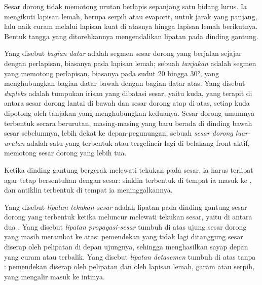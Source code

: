Sesar dorong tidak memotong urutan berlapis sepanjang satu bidang lurus.
Ia mengikuti lapisan lemah, berupa serpih atau evaporit, untuk jarak yang panjang, lalu
naik curam melalui lapisan kuat di atasnya hingga lapisan lemah berikutnya. Bentuk
tangga yang ditorehkannya mengendalikan lipatan pada dinding gantung.

\begin{definition}\label{def:b3:orogenic-wedges:thrust-geometry}
Yang disebut \emph{bagian datar} adalah segmen sesar dorong yang berjalan
sejajar dengan perlapisan, biasanya pada lapisan lemah; sebuah \emph{tanjakan}
adalah segmen yang memotong perlapisan,
biasanya pada sudut 20 hingga \ang{30}, yang menghubungkan bagian datar bawah dengan bagian datar atas. Yang disebut
\emph{dupleks} adalah tumpukan irisan yang dibatasi sesar,
yaitu kuda, yang terapit di antara sesar dorong lantai di bawah dan sesar dorong atap di atas,
setiap kuda dipotong oleh tanjakan yang menghubungkan keduanya. Sesar dorong umumnya terbentuk
secara berurutan, masing-masing yang baru berada di dinding bawah sesar sebelumnya, lebih dekat ke
depan-pegunungan; sebuah \emph{sesar dorong luar-urutan} adalah
satu yang terbentuk atau tergelincir lagi di belakang front aktif, memotong sesar dorong yang lebih tua.
\end{definition}

Ketika dinding gantung bergerak melewati tekukan pada sesar, ia harus terlipat agar tetap
bersentuhan dengan sesar: sinklin terbentuk di tempat ia masuk ke , dan
antiklin terbentuk di tempat ia meninggalkannya.

\begin{definition}\label{def:b3:orogenic-wedges:thrust-folds}
Yang disebut \emph{lipatan tekukan-sesar} adalah lipatan pada dinding gantung
sesar dorong yang terbentuk ketika meluncur melewati tekukan sesar, yaitu  di antara
dua . Yang disebut \emph{lipatan propagasi-sesar}
tumbuh di atas ujung sesar dorong yang masih merambat ke atas: pemendekan yang
tidak lagi ditanggung sesar diserap oleh pelipatan di depan
ujungnya, sehingga menghasilkan sayap depan yang curam atau terbalik. Yang disebut
\emph{lipatan detasemen} tumbuh di atas  tanpa : pemendekan
diserap oleh pelipatan dan oleh lapisan lemah, garam atau serpih, yang mengalir masuk ke
intinya.
\end{definition}

